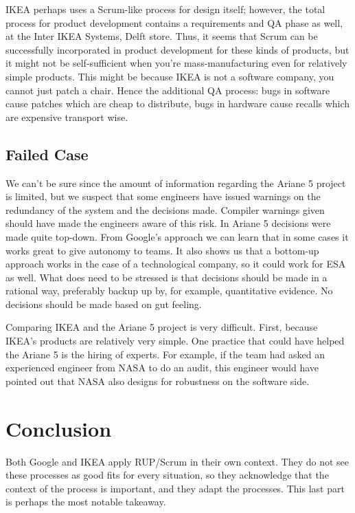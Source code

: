 IKEA perhaps uses a Scrum-like process for design itself; however, the total process for product development contains a requirements and QA phase as well, at the Inter IKEA Systems, Delft store.
Thus, it seems that Scrum can be successfully incorporated in product development for these kinds of products, but it might not be self-sufficient when you're mass-manufacturing even for relatively simple products.
This might be because IKEA is not a software company, you cannot just patch a chair.
Hence the additional QA process: bugs in software cause patches which are cheap to distribute, bugs in hardware cause recalls which are expensive transport wise.

\subsection{Failed Case}
We can't be sure since the amount of information regarding the Ariane 5 project is limited, but we suspect that some engineers have issued warnings on the redundancy of the system and the decisions made.
Compiler warnings given should have made the engineers aware of this risk.
In Ariane 5 decisions were made quite top-down. From Google's approach we can learn that in some cases it works great to give autonomy to teams.
It also shows us that a bottom-up approach works in the case of a technological company, so it could work for ESA as well.
What does need to be stressed is that decisions should be made in a rational way, preferably backup up by, for example, quantitative evidence.
No decisions should be made based on gut feeling.

Comparing IKEA and the Ariane 5 project is very difficult.
First, because IKEA's products are relatively very simple.
One practice that could have helped the Ariane 5 is the hiring of experts.
For example, if the team had asked an experienced engineer from NASA to do an audit, this engineer would have pointed out that NASA also designs for robustness on the software side.

\section{Conclusion}
Both Google and IKEA apply RUP/Scrum in their own context.
They do not see these processes as good fits for every situation, so they acknowledge that the context of the process is important, and they adapt the processes.
This last part is perhaps the most notable takeaway.